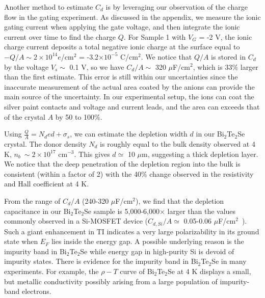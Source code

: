 Another method to estimate $C_d$ is by leveraging our observation of the charge flow in the gating experiment. As discussed in the appendix, we measure the ionic gating current when applying the gate voltage, and then integrate the ionic current over time to find the charge $Q$.
For Sample 1 with $V_G$ = -2 V, the ionic charge current deposits a total negative ionic charge at the surface equal to
$-Q/A\sim 2\times 10^{14}e$/cm$^2$ = -3.2$\times 10^{-5}$ C/cm$^2$. 
We notice that $Q/A$ is stored in $C_d$ by the voltage $V_s\sim$ 0.1 V,
so we have $C_d/A\sim$ 320 $\mu$F/cm$^2$, which is 33$\%$ larger than the first estimate. This error is still within our uncertainties since the inaccurate measurement of the actual area coated by the anions can provide the main source of the uncertainty. In our experimental setup, the ions can coat the silver paint contacts and voltage and current leads, and the area can exceeds that of the crystal $A$ by 50 to 100$\%$.

Using $\frac Q A = N_d e d + \sigma_s$, we can estimate the depletion width $d$ in our Bi$_2$Te$_2$Se crystal.
The donor density $N_d$ is roughly equal to the bulk density observed at 4 K, $n_b~\sim 2\times 10^{17}$ cm$^{-3}$.
This gives $d\simeq$ 10 $\mu$m, suggesting a thick depletion layer. We notice that the deep penetration of the depletion region into the bulk
is consistent (within a factor of 2) with the 40$\%$ change observed in the resistivity and Hall coefficient at 4 K.

From the range of $C_d/A$ (240-320 $\mu$F/cm$^2$), we find that the depletion capacitance in our Bi$_2$Te$_2$Se sample is 5,000-6,000$\times$ larger than the values commonly observed in a Si-MOSFET device ($C_{d,Si}/A\simeq$ 0.05-0.06 $\mu$F/cm$^2$~\cite{SternRMP,Sze}).
Such a giant enhancement in TI indicates a very large polarizability in its ground state when $E_F$ lies inside the energy gap. A possible underlying reason is the impurity band in Bi$_2$Te$_2$Se while energy gap in high-purity Si is devoid of impurity states. There is evidence for the impurity band in Bi$_2$Te$_2$Se in many experiments\cite{Ando10}. For example, the $\rho-T$ curve of
Bi$_2$Te$_2$Se at 4 K displays a small, but metallic conductivity possibly arising from a large population of impurity-band electrons.


